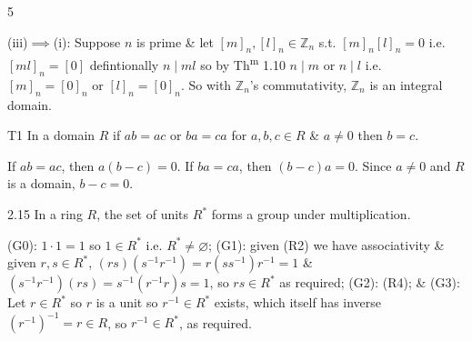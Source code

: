 \documentclass[8pt]{extarticle}
\makeatletter
\renewenvironment{proof}[1][\proofname]{%
  \par%
  \pushQED{\qed}%
  \normalfont
  \topsep=2pt\partopsep=0pt\parsep=0pt\itemsep=0pt%
  \trivlist
  \item[\hskip\labelsep\itshape #1\@addpunct{.}]\ignorespaces
}{%
  \popQED\endtrivlist\@endpefalse
  \vspace{-1pt}%
}
\makeatother
\begin{document}
\begin{multicols*}{5}
\begin{proof}
            (iii)\(\implies\)(i):
            Suppose \(n\) is prime \& let \([m]_n,[l]_n\in\mathbb{Z}_n\) s.t. \([m]_n[l]_n=0\) i.e. \([ml]_n=[0]\) defintionally \(n\mid ml\) so by Th\textsuperscript{m} 1.10 \(n\mid m\) or \(n\mid l\) i.e. \([m]_n=[0]_n\) or \([l]_n=[0]_n\). So with \(\mathbb{Z}_n\)'s commutativity, \(\mathbb{Z}_n\) is an integral domain.
        \end{proof}

        \begin{proposition}{T1}
            In a domain \(R\) if \(ab=ac\) or \(ba=ca\) for \(a,b,c\in R\) \& \(a\ne0\) then \(b=c\).
        \end{proposition}

        \begin{proof}
            If \(ab=ac\), then \(a(b-c)=0\). If \(ba=ca\), then \((b-c)a=0\). Since \(a\ne0\) and \(R\) is a domain, \(b-c=0\).        
        \end{proof}

        \begin{lemma}{2.15}
            In a ring \(R\), the set of units \(R^*\) forms a group under multiplication.
        \end{lemma}

        \begin{proof}
            (G0): \(1\cdot1=1\) so \(1\in R^*\) i.e. \(R^*\ne\varnothing\); (G1): given (R2) we have associativity \& given \(r,s\in R^*\), \((rs)(s^{-1}r^{-1})=r(ss^{-1})r^{-1}=1\) \&
            \((s^{-1}r^{-1})(rs)=s^{-1}(r^{-1}r)s=1\), so \(rs\in R^*\) as required; (G2): (R4); \& (G3): Let \(r\in R^*\) so \(r\) is a unit so \(r^{-1}\in R^*\) exists, which itself has inverse \((r^{-1})^{-1}=r\in R\), so \(r^{-1}\in R^*\), as required.

        \end{proof}

        \vspace{-2pt}
        \noindent{}
\end{multicols*}
\end{document}

